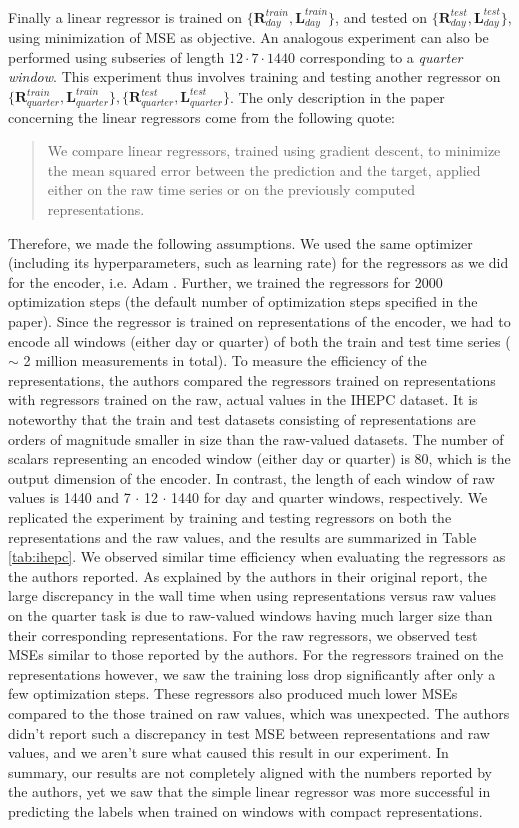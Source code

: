 Finally a linear regressor is trained on $\{\mathbf{R}_{day}^{train},\mathbf{L}_{day}^{train}\}$, and tested on $\{\mathbf{R}_{day}^{test},\mathbf{L}_{day}^{test}\}$, using minimization of MSE as objective. An analogous experiment can also be performed using subseries of length $12\cdot7\cdot1440$ corresponding to a \textit{quarter window}. This experiment thus involves training and testing another regressor on $\{\mathbf{R}_{quarter}^{train},\mathbf{L}_{quarter}^{train}\},\{\mathbf{R}_{quarter}^{test},\mathbf{L}_{quarter}^{test}\}$.
The only description in the paper concerning the linear regressors come from the following quote:
\begin{quote}
We compare linear regressors, trained using gradient descent, to minimize the mean squared error between the prediction and the target, applied either on the raw time series or on the previously computed representations.
\end{quote}
Therefore, we made the following assumptions. We used the same optimizer (including its hyperparameters, such as learning rate) for the regressors as we did for the encoder, i.e. Adam \citep{kingma2014adam}. Further, we trained the regressors for 2000 optimization steps (the default number of optimization steps specified in the paper). Since the regressor is trained on representations of the encoder, we had to encode all windows (either day or quarter) of both the train and test time series ($\sim$ 2 million measurements in total). To measure the efficiency of the representations, the authors compared the regressors trained on representations with regressors trained on the raw, actual values in the IHEPC dataset. It is noteworthy that the train and test datasets consisting of representations are orders of magnitude smaller in size than the raw-valued datasets. The number of scalars representing an encoded window (either day or quarter) is 80, which is the output dimension of the encoder. In contrast, the length of each window of raw values is 1440 and 7 $\cdot$ 12 $\cdot$ 1440 for day and quarter windows, respectively. We replicated the experiment by training and testing regressors on both the representations and the raw values, and the results are summarized in Table \ref{tab:ihepc}. We observed similar time efficiency when evaluating the regressors as the authors reported. As explained by the authors in their original report, the large discrepancy in the wall time when using representations versus raw values on the quarter task is due to raw-valued windows having much larger size than their corresponding representations. For the raw regressors, we observed test MSEs similar to those reported by the authors. For the regressors trained on the representations however, we saw the training loss drop significantly after only a few optimization steps. These regressors also produced much lower MSEs compared to the those trained on raw values, which was unexpected. The authors didn't report such a discrepancy in test MSE between representations and raw values, and we aren't sure what caused this result in our experiment. In summary, our results are not completely aligned with the numbers reported by the authors, yet we saw that the simple linear regressor was more successful in predicting the labels when trained on windows with compact representations.
